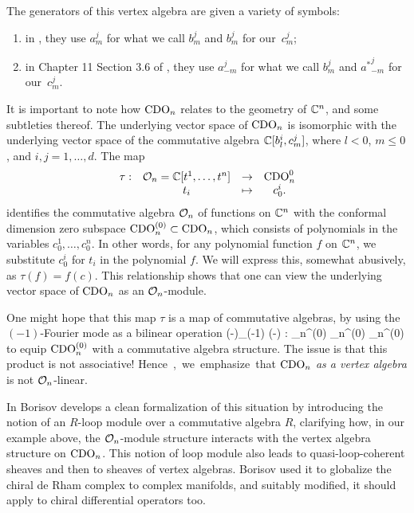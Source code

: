 \begin{rmk}\label{rmk:notations}
The generators of this vertex algebra are given a variety of symbols:
\begin{enumerate}
\item in \cite{MSV}, they use $a^j_{m}$ for what we call $b^j_m$ and $b^j_{m}$ for our~$c^j_m$;
\item in Chapter 11 Section 3.6 of \cite{BZF}, they use $a^j_{-m}$ for what we call $b^j_m$ and ${a^{\ast}}^j_{-m}$ for our~$c^j_m$.
\end{enumerate}
\end{rmk}

It is important to note how ${\rm CDO}_n$ relates to the geometry of $\mathbb C^n$, and some subtleties thereof.
The underlying vector space of ${\rm CDO}_n$ is isomorphic with the underlying vector space of the commutative algebra $\mathbb C [b_{l}^i, c_{m}^j]$, 
where $l < 0$, $m \leq 0$, and $i,j = 1,\ldots,d$. 
The map
\[
\begin{array}{cccc}
\label{poly}
\tau : &\mathcal O_n = \mathbb C [t^1,\ldots, t^n] &\to& {\rm CDO}^0_n\\ 
& t_i & \mapsto & c_0^i .
\end{array}
\]
identifies the commutative algebra $\mathcal O_n$ of functions on $\mathbb C^n$ with the conformal dimension zero subspace ${\rm CDO}_n^{(0)} \subset {\rm CDO}_n$, 
which consists of polynomials in the variables $c_0^1,\ldots, c_0^{n}$. 
In other words, for any polynomial function $f$ on $\mathbb C^n$, we substitute $c^i_0$ for $t_i$ in the polynomial $f$.
We will express this, somewhat abusively, as $\tau(f) = f(c)$.
This relationship shows that one can view the underlying vector space of ${\rm CDO}_n$ as an $\mathcal O_n$-module.

One might hope that this map $\tau$ is a map of commutative algebras,
by using the $(-1)$-Fourier mode as a bilinear operation
\ben
(-)_{(-1)} (-) : \CDO_n^{(0)} \times \CDO_n^{(0)} \to \CDO_n^{(0)} 
\een
to equip ${\rm CDO}_n^{(0)}$ with a commutative algebra structure.
The issue is that this product is not associative! \si 
Hence, we emphasize that ${\rm CDO}_n$ {\em as a vertex algebra} is not $\mathcal O_n$-linear. 

\begin{rmk}
In \cite{BorVAMS} Borisov develops a clean formalization of this situation by introducing the notion of an $R$-loop module over a commutative algebra $R$,
clarifying how, in our example above, the $\mathcal O_n$-module structure interacts with the vertex algebra structure on ${\rm CDO}_n$.
This notion of loop module also leads to quasi-loop-coherent sheaves and then to sheaves of vertex algebras.
Borisov used it to globalize the chiral de Rham complex to complex manifolds, 
and suitably modified, it should apply to chiral differential operators too.
\end{rmk}

